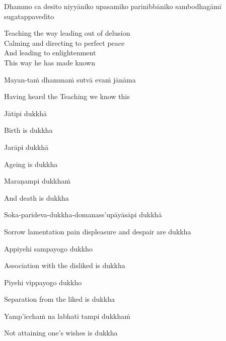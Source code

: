 Dhammo ca desito niyyāniko upasamiko parinibbāniko sambodhagāmī sugatappavedito

\begin{english}
  Teaching the way leading out of delusion\\
  Calming and directing to perfect peace\\
  And leading to enlightenment\\
  This way he has made known\\
\end{english}

Mayan-taṁ dhammaṁ sutvā evaṁ jānāma

\begin{english}
  Having heard the Teaching we know this
\end{english}

Jātipi dukkhā

\begin{english}
  Birth is dukkha
\end{english}

Jarāpi dukkhā

\begin{english}
  Ageing is dukkha
\end{english}

Maraṇampi dukkhaṁ

\begin{english}
  And death is dukkha
\end{english}

Soka-parideva-dukkha-domanass'upāyāsāpi dukkhā

\begin{english}
  Sorrow lamentation pain displeasure
  and despair are dukkha
\end{english}

Appiyehi sampayogo dukkho

\begin{english}
  Association with the disliked is dukkha
\end{english}

Piyehi vippayogo dukkho

\begin{english}
  Separation from the liked is dukkha
\end{english}

Yamp'icchaṁ na labhati tampi dukkhaṁ

\begin{english}
  Not attaining one’s wishes is dukkha
\end{english}

